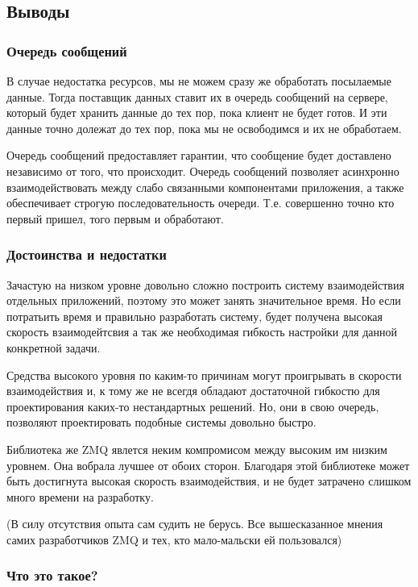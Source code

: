 \documentclass[12pt]{article}
\begin{document}
\subsection*{Выводы}

\subsubsection*{Очередь сообщений}

В случае недостатка ресурсов, мы не можем сразу же обработать посылаемые данные. Тогда поставщик данных ставит их в очередь сообщений на сервере, который будет хранить данные до тех пор, пока клиент не будет готов. И эти данные точно долежат до тех пор, пока мы не освободимся и их не обработаем.

Очередь сообщений предоставляет гарантии, что сообщение будет доставлено независимо от того, что происходит. Очередь сообщений позволяет асинхронно взаимодействовать между слабо связанными компонентами приложения, а также обеспечивает строгую последовательность очереди. Т.е. совершенно точно кто первый пришел, того первым и обработают.

\subsubsection*{Достоинства и недостатки}

Зачастую на низком уровне довольно сложно построить систему взаимодействия отдельных приложений, поэтому это может занять значительное время. Но если потратьить время и правильно разработать систему, будет получена высокая скорость взаимодейтсвия а так же необходимая гибкость настройки для данной конкретной задачи.

Средства высокого уровня по каким-то причинам могут проигрывать в скорости взаимодействия и, к тому же не всегдя обладают достаточной гибкостю для проектирования каких-то нестандартных решений. Но, они в свою очередь, позволяют проектировать подобные системы довольно быстро.

Библиотека же ZMQ явлется неким компромисом между высоким им низким уровнем. Она вобрала лучшее от обоих сторон. Благодаря этой библиотеке может быть достигнута высокая скорость взаимодействия, и не будет затрачено слишком много времени на разработку. 

(В силу отсутствия опыта сам судить не берусь. Все вышесказанное мнения самих разработчиков ZMQ и тех, кто мало-мальски ей пользовался)

\subsubsection*{Что это такое?}
\end{document}
